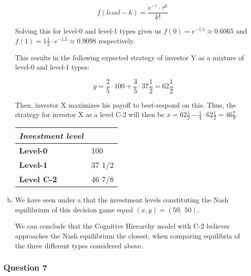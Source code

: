 \documentclass[a4paper]{article}
\begin{document}
\begin{enumerate}[(a)]
\[f\left( level - k \right) = \frac{e^{- \tau} \cdot \tau^{k}}{k!}\ \]

Solving this for level-0 and level-1 types gives us
\(f\left( 0 \right) = e^{- 1.5} \approx 0.6065\) and
\(f\left( 1 \right) = 1\frac{1}{2} \cdot e^{- 1.5} \approx 0.9098\)
respectively.

This results in the following expected strategy of investor Y as a
mixture of level-0 and level-1 types:

\[y = \frac{2}{5} \cdot 100 + \frac{3}{5} \cdot 37\frac{1}{2} = 62\frac{1}{2}\]

Then, investor X maximizes his payoff to best-respond on this. Thus, the
strategy for investor X as a level C-2 will then be
\(x = 62\frac{1}{2} - \frac{1}{4} \cdot 62\frac{1}{2} = 46\frac{7}{8}\).

\begin{longtable}[]{@{}ll@{}}
\toprule
\emph{Investment level }\tabularnewline
\midrule

\textbf{Level-0} & 100\tabularnewline
\textbf{Level-1} & 37 1/2\tabularnewline
\textbf{Level C-2} & 46 7/8\tabularnewline
\bottomrule
\end{longtable}


\item
We have seen under a that the investment levels constituting the Nash
equilibrium of this decision game equal
\(\left( x,y \right) = (50,\ 50)\).

We can conclude that the Cognitive Hierarchy model with C-2 believes
approaches the Nash equilibrium the closest, when comparing equilibria
of the three different types considered above.

\end{enumerate}

\subsubsection{Question 7}
\end{document}
